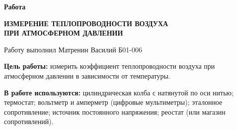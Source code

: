 

\shiftedText{0.5cm}{14cm}
{

    \begin{center}
    \vspace*{1.0cm}    
        
        {\bf\huge Работа \labnum }
        
    \vspace*{0.2cm}    
        
        {\bf\Large ИЗМЕРЕНИЕ ТЕПЛОПРОВОДНОСТИ ВОЗДУХА \\ ПРИ АТМОСФЕРНОМ ДАВЛЕНИИ }
        
    \vspace*{0.8cm}
        
        {\Large Работу выполнил Матренин Василий Б01-006 }
        
    \vspace*{1.6cm}
    
    \end{center}
    
    {\bf\noindent Цель работы: }  измерить коэффициент теплопроводности воздуха при атмосферном давлении в зависимости от температуры.
    
    \vspace*{0.6cm}
    
    {\bf\noindent В работе используются: } цилиндрическая колба с натянутой по оси нитью; термостат; вольтметр и амперметр (цифровые мультиметры); эталонное сопротивление; источник постоянного напряжения; реостат (или магазин сопротивлений).

}

\newpage